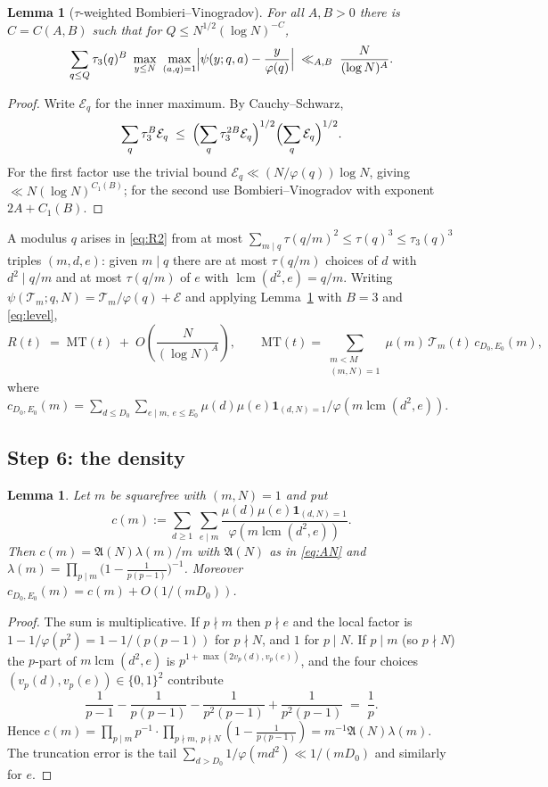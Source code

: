 \documentclass[11pt,a4paper]{article}
\theoremstyle{plain}
\newtheorem{lemma}[theorem]{Lemma}
\theoremstyle{definition}
\theoremstyle{remark}
\newcommand{\AAA}{\mathfrak{A}}
\newcommand{\Tcut}{\mathcal T}
\DeclareMathOperator{\lcm}{lcm}
\begin{document}
\begin{lemma}[$\tau$-weighted Bombieri--Vinogradov]\label{lem:BV}
For all $A,B>0$ there is $C=C(A,B)$ such that for
$Q\le N^{1/2}(\log N)^{-C}$,
\[
  \sum_{q\le Q}\tau_3(q)^{B}\ \max_{y\le N}\ \max_{(a,q)=1}
  \Bigl|\psi(y;q,a)-\frac{y}{\varphi(q)}\Bigr|
  \;\ll_{A,B}\;\frac{N}{(\log N)^{A}}.
\]
\end{lemma}

\begin{proof}
Write $\mathcal E_q$ for the inner maximum. By Cauchy--Schwarz,
\[
  \sum_q\tau_3^B\mathcal E_q
  \;\le\;\Bigl(\sum_q\tau_3^{2B}\mathcal E_q\Bigr)^{1/2}
         \Bigl(\sum_q\mathcal E_q\Bigr)^{1/2}.
\]
For the first factor use the trivial bound
$\mathcal E_q\ll(N/\varphi(q))\log N$, giving $\ll N(\log N)^{C_1(B)}$;
for the second use Bombieri--Vinogradov \cite{MoV} with exponent
$2A+C_1(B)$.
\end{proof}

A modulus $q$ arises in \eqref{eq:R2} from at most
$\sum_{m\mid q}\tau(q/m)^2\le\tau(q)^3\le\tau_3(q)^3$ triples
$(m,d,e)$: given $m\mid q$ there are at most $\tau(q/m)$ choices of
$d$ with $d^2\mid q/m$ and at most $\tau(q/m)$ of $e$ with
$\lcm(d^2,e)=q/m$. Writing $\psi(\Tcut_m;q,N)=\Tcut_m/\varphi(q)+\mathcal E$
and applying Lemma~\ref{lem:BV} with $B=3$ and \eqref{eq:level},
\begin{equation}\label{eq:R3}
  R(t)\;=\;\mathrm{MT}(t)\;+\;O\!\left(\frac{N}{(\log N)^{A}}\right),
  \qquad
  \mathrm{MT}(t)=\sum_{\substack{m<M\\ (m,N)=1}}
       \mu(m)\,\Tcut_m(t)\,c_{D_0,E_0}(m),
\end{equation}
where
$c_{D_0,E_0}(m)=\sum_{d\le D_0}\sum_{e\mid m,\,e\le E_0}
\mu(d)\mu(e)\mathbf 1_{(d,N)=1}/\varphi(m\lcm(d^2,e))$.

\subsection{Step 6: the density}

\begin{lemma}\label{lem:density}
Let $m$ be squarefree with $(m,N)=1$ and put
\[
  c(m):=\sum_{d\ge1}\ \sum_{e\mid m}
     \frac{\mu(d)\mu(e)\mathbf 1_{(d,N)=1}}{\varphi(m\lcm(d^2,e))}.
\]
Then $c(m)=\AAA(N)\lambda(m)/m$ with $\AAA(N)$ as in \eqref{eq:AN} and
$\lambda(m)=\prod_{p\mid m}\bigl(1-\tfrac{1}{p(p-1)}\bigr)^{-1}$.
Moreover $c_{D_0,E_0}(m)=c(m)+O(1/(mD_0))$.
\end{lemma}

\begin{proof}
The sum is multiplicative. If $p\nmid m$ then $p\nmid e$ and the local
factor is $1-1/\varphi(p^2)=1-1/(p(p-1))$ for $p\nmid N$, and $1$ for
$p\mid N$. If $p\mid m$ (so $p\nmid N$) the $p$-part of
$m\lcm(d^2,e)$ is $p^{1+\max(2v_p(d),v_p(e))}$, and the four choices
$(v_p(d),v_p(e))\in\{0,1\}^2$ contribute
\[
  \frac{1}{p-1}-\frac{1}{p(p-1)}-\frac{1}{p^2(p-1)}+\frac{1}{p^2(p-1)}
  \;=\;\frac{1}{p}.
\]
Hence $c(m)=\prod_{p\mid m}p^{-1}\cdot
\prod_{p\nmid m,\ p\nmid N}(1-\tfrac{1}{p(p-1)})
=m^{-1}\AAA(N)\lambda(m)$. The truncation error is the tail
$\sum_{d>D_0}1/\varphi(md^2)\ll1/(mD_0)$ and similarly for $e$.
\end{proof}
\end{document}

